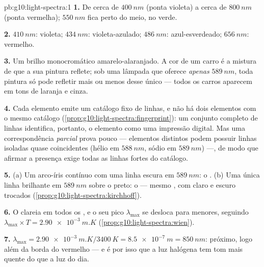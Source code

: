 \begin{solution}{pb:g10:light-spectra:1}
\textbf{1.} De cerca de $\qty{400}{nm}$ (ponta violeta) a cerca de
$\qty{800}{nm}$ (ponta vermelha); $\qty{550}{nm}$ fica perto do meio, no
verde.

\textbf{2.} $\qty{410}{nm}$: violeta; $\qty{434}{nm}$: violeta-azulado;
$\qty{486}{nm}$: azul-esverdeado; $\qty{656}{nm}$: vermelho.

\textbf{3.} Um brilho monocromático amarelo-alaranjado. A cor de um carro é
a mistura de  que a sua pintura reflete; sob uma lâmpada
que oferece \emph{apenas} $\qty{589}{nm}$, toda pintura só pode refletir
mais ou menos desse único  --- todos os carros aparecem
em tons de laranja e cinza.

\textbf{4.} Cada elemento emite um catálogo fixo de linhas, e não há dois
elementos com o mesmo catálogo
(\cref{prop:g10:light-spectra:fingerprint}): um conjunto completo de linhas
identifica, portanto, o elemento como uma impressão digital. Mas uma
correspondência \emph{parcial} prova pouco --- elementos distintos podem
possuir linhas isoladas quase coincidentes (hélio em $\qty{588}{nm}$, sódio
em $\qty{589}{nm}$) ---, de modo que afirmar a presença exige todas as
linhas fortes do catálogo.

\textbf{5.} (a) Um arco-íris contínuo com uma linha escura em
$\qty{589}{nm}$: o . (b) Uma única linha brilhante em
$\qty{589}{nm}$ sobre o preto: o  --- mesmo , com claro e escuro trocados
(\cref{prop:g10:light-spectra:kirchhoff}).

\textbf{6.} O  clareia em todos os , e o seu
pico $\lambda_{\max}$ se desloca para  menores, seguindo
$\lambda_{\max} \times T = \qty{2.90e-3}{m.K}$
(\cref{prop:g10:light-spectra:wien}).

\textbf{7.} $\lambda_{\max} = \qty{2.90e-3}{m.K} / \qty{3400}{K}
= \qty{8.5e-7}{m} = \qty{850}{nm}$:  próximo, logo além da
borda do vermelho --- e é por isso que a luz halógena tem tom mais quente do
que a luz do dia.


\end{solution}
